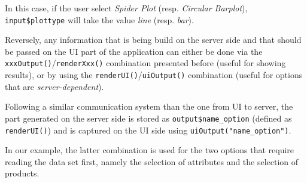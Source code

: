 \documentclass[
]{book}
\begin{document}
In this case, if the user select \emph{Spider Plot} (resp. \emph{Circular Barplot}), \texttt{input\$plottype} will take the value \emph{line} (resp. \emph{bar}).

Reversely, any information that is being build on the server side and that should be passed on the UI part of the application can either be done via the \texttt{xxxOutput()}/\texttt{renderXxx()} combination presented before (useful for showing results), or by using the \texttt{renderUI()}/\texttt{uiOutput()} combination (useful for options that are \emph{server-dependent}).

Following a similar communication system than the one from UI to server, the part generated on the server side is stored as \texttt{output\$name\_option} (defined as \texttt{renderUI()}) and is captured on the UI side using \texttt{uiOutput("name\_option")}.

In our example, the latter combination is used for the two options that require reading the data set first, namely the selection of attributes and the selection of products.
\end{document}
